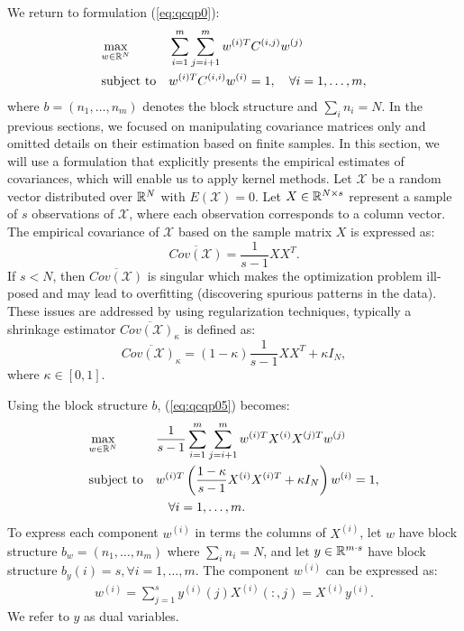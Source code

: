 We return to formulation (\ref{eq:qcqp0}):
\begin{equation*}
\begin{aligned}
& \underset{w \in \mathbb{R}^N}{\text{max}}
& & \sum_{i = 1}^m \sum_{j = i+1 }^m w^{(i)T} C^{(i,j)} w^{(j)}\\
& \text{subject to}
& &w^{(i)T} C^{(i,i)} w^{(i)} = 1, \quad\forall i = 1,\ldots, m,
\end{aligned}
\end{equation*}
where $b = \left(n_1,\ldots,n_m\right)$ denotes the block structure
and $ \sum_i n_i = N $.
In the previous sections, we focused on manipulating covariance matrices 
only and omitted details on their estimation based on finite samples. 
In this section, we will use a formulation that explicitly presents 
the empirical estimates of covariances, which will enable us to apply kernel methods.
Let $\mathcal{X}$ be a random vector distributed over $\mathbb{R}^N$ with
$E\left(\mathcal{X}\right) = 0$. Let $X \in \mathbb{R}^{N \times s}$
represent a sample of $s$ observations of $\mathcal{X}$, where each
observation corresponds to a column vector. The empirical covariance of $\mathcal{X}$ 
based on the sample matrix $X$ is expressed as: 
$$ \overline{Cov\left(\mathcal{X}\right)} = \frac{1}{s - 1}X X^T.$$
If $s < N$, then $\overline{Cov\left(\mathcal{X}\right)}$ is singular which 
makes the optimization problem ill-posed and may lead to overfitting 
(discovering spurious patterns in the data). These issues are addressed by 
using regularization techniques, typically a shrinkage estimator 
$\overline{Cov\left(\mathcal{X}\right)_{\kappa}}$ is defined as: 
$$ \overline{Cov\left(\mathcal{X}\right)_{\kappa}} = \left(1-\kappa\right)
 \frac{1}{s - 1}X X^T + \kappa  I_N,$$ where $\kappa \in \left[0,1\right]$.

Using the block structure $b$, (\ref{eq:qcqp05}) becomes:
 \begin{equation}\label{eq:regqcqp}
\begin{aligned}
& \underset{w \in \mathbb{R}^N}{\text{max}}
& & \frac{1}{s -1} \sum_{i = 1}^m \sum_{j = i+1}^m w^{(i)T} X^{(i)}X^{(j)T} w^{(j)} \\
& \text{subject to}
& & w^{(i)T} \left(\frac{1- \kappa}{s - 1}X^{(i)} X^{(i)T} + \kappa  I_N\right) w^{(i)} = 1,\\&&& \quad\forall i = 1,\ldots, m.
\end{aligned}
\end{equation}
To express each component $w^{(i)}$ in terms the columns of $X^{(i)}$,
let $w$ have block structure $b_w = \left(n_1, \ldots, n_m\right)$
where $\sum_i n_i = N$, and let $y \in \mathbb{R}^{m\cdot s}$ have block
structure $b_y\left(i\right) = s, \forall i = 1,\ldots, m$. The
component $w^{(i)}$ can be expressed as:
\begin{equation}\label{eq:representer}
\begin{aligned}
w^{(i)} = \sum_{j = 1}^{s} y^{(i)}\left(j\right) X^{(i)}\left(:,j\right) = X^{(i)} y^{(i)}.
\end{aligned}
\end{equation}
We refer to $y$ as dual variables.


